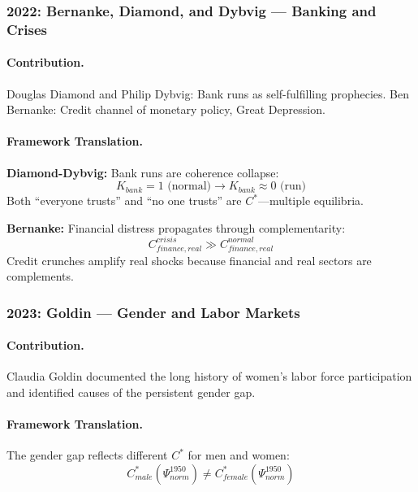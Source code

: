 \documentclass[12pt,a4paper]{article}
\begin{document}
\subsubsection{2022: Bernanke, Diamond, and Dybvig --- Banking and Crises}

\paragraph{Contribution.}
Douglas Diamond and Philip Dybvig: Bank runs as self-fulfilling prophecies.
Ben Bernanke: Credit channel of monetary policy, Great Depression.

\paragraph{Framework Translation.}
\textbf{Diamond-Dybvig:} Bank runs are coherence collapse:
\begin{equation}
  K_{bank} = 1 \text{ (normal)} \to K_{bank} \approx 0 \text{ (run)}
\end{equation}
Both ``everyone trusts'' and ``no one trusts'' are $C^*$---multiple equilibria.

\textbf{Bernanke:} Financial distress propagates through complementarity:
\begin{equation}
  C_{finance, real}^{crisis} \gg C_{finance, real}^{normal}
\end{equation}
Credit crunches amplify real shocks because financial and real sectors are complements.

\subsubsection{2023: Goldin --- Gender and Labor Markets}

\paragraph{Contribution.}
Claudia Goldin documented the long history of women's labor force participation
and identified causes of the persistent gender gap.

\paragraph{Framework Translation.}
The gender gap reflects different $C^*$ for men and women:
\begin{equation}
  C^*_{male}(\Psi_{norm}^{1950}) \neq C^*_{female}(\Psi_{norm}^{1950})
\end{equation}
\end{document}
